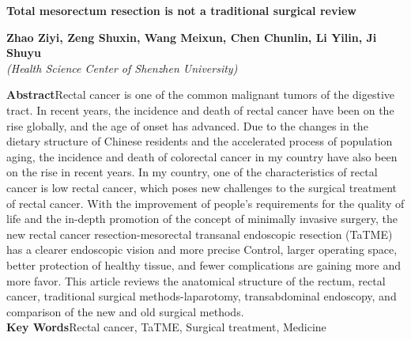 \documentclass[a4paper,11pt,onecolumn,twoside]{article}
\begin{document}
\vspace{.1cm}
\begin{center}
    \parbox{\textwidth}{
    \begin{center}
        {\large{\textbf{Total mesorectum resection is not a traditional surgical review}}}\\[4pt]
        \vspace{-0.5cm}\end{center}
    \begin{center}
        \textbf{Zhao Ziyi, Zeng Shuxin, Wang Meixun, Chen Chunlin, Li Yilin, Ji Shuyu}\\[2pt]
        \small{\textit{(Health Science Center of Shenzhen University)}}\\[2pt]
    \end{center}
    {\small{\textbf{Abstract}\quad Rectal cancer is one of the common malignant tumors of the digestive tract. In recent years, the incidence and death of rectal cancer have been on the rise globally, and the age of onset has advanced. Due to the changes in the dietary structure of Chinese residents and the accelerated process of population aging, the incidence and death of colorectal cancer in my country have also been on the rise in recent years. In my country, one of the characteristics of rectal cancer is low rectal cancer, which poses new challenges to the surgical treatment of rectal cancer. With the improvement of people’s requirements for the quality of life and the in-depth promotion of the concept of minimally invasive surgery, the new rectal cancer resection-mesorectal transanal endoscopic resection (TaTME) has a clearer endoscopic vision and more precise Control, larger operating space, better protection of healthy tissue, and fewer complications are gaining more and more favor. This article reviews the anatomical structure of the rectum, rectal cancer, traditional surgical methods-laparotomy, transabdominal endoscopy, and comparison of the new and old surgical methods.
        \\
        \textbf{Key Words}\quad Rectal cancer, TaTME, Surgical treatment, Medicine}}
    }
\end{center}

\setlength{\oddsidemargin}{-.5cm}
\setlength{\evensidemargin}{\oddsidemargin}
\setlength{\textwidth}{17.00cm}
\end{document}
